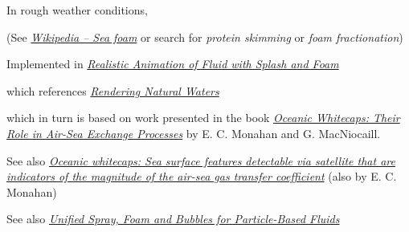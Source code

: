 In rough weather conditions, 

(See \textit{\href{http://en.wikipedia.org/wiki/Sea_foam}{Wikipedia -- Sea foam}} or search for \textit{protein skimming} or \textit{foam fractionation})

Implemented in \textit{\href{http://nguyendangbinh.org/Proceedings/Eurographics/2003/cgf/volume22/issue3/paper127/paper127.pdf}{Realistic Animation of Fluid with Splash and Foam}}

which references \textit{\href{http://citeseerx.ist.psu.edu/viewdoc/download?doi=10.1.1.4.6262&rep=rep1&type=pdf}{Rendering Natural Waters}}

which in turn is based on work presented in the book \textit{\href{http://books.google.se/books?id=xuwFz1bPTHgC}{Oceanic Whitecaps: Their Role in Air-Sea Exchange Processes}} by E. C. Monahan and G. MacNiocaill.

See also \textit{\href{http://www.ias.ac.in/jess/sep2002/Ps18.pdf}{Oceanic whitecaps: Sea surface features detectable via satellite that are indicators of the magnitude of the air-sea gas transfer coefficient}} (also by  E. C. Monahan)

See also \textit{\href{http://cg.informatik.uni-freiburg.de/publications/2012_CGI_sprayFoamBubbles.pdf}{Unified Spray, Foam and Bubbles for Particle-Based Fluids}}




